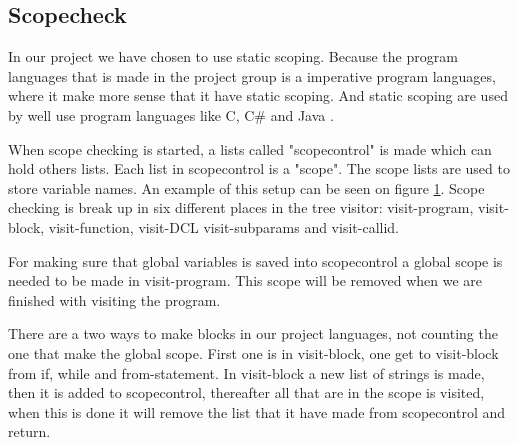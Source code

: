 \subsection{Scopecheck}
In our project we have chosen to use static scoping. Because the program languages that is made in the project group is a imperative program languages, where it make more sense that it have static scoping. And static scoping are used by well use program languages like C, C\# and Java \citep{ProgrammingCommunityIndex}.

When scope checking is started, a lists called "scopecontrol" is made which can hold others lists. Each list in scopecontrol is a "scope". The scope lists are used to store variable names. An example of this setup can be seen on figure \ref{fig:scopediagram}. Scope checking is break up in six different places in the tree visitor: visit-program, visit-block, visit-function, visit-DCL visit-subparams and visit-callid.

\begin{figure}[H]
\label{fig:scopediagram}
\end{figure}

For making sure that global variables is saved into scopecontrol a global scope is needed to be made in visit-program. This scope will be removed when we are finished with visiting the program.

There are a two ways to make blocks in our project languages, not counting the one that make the global scope. First one is in visit-block, one get to visit-block from if, while and from-statement. In visit-block a new list of strings is made, then it is added to scopecontrol, thereafter all that are in the scope is visited, when this is done it will remove the list that it have made from scopecontrol and return.

